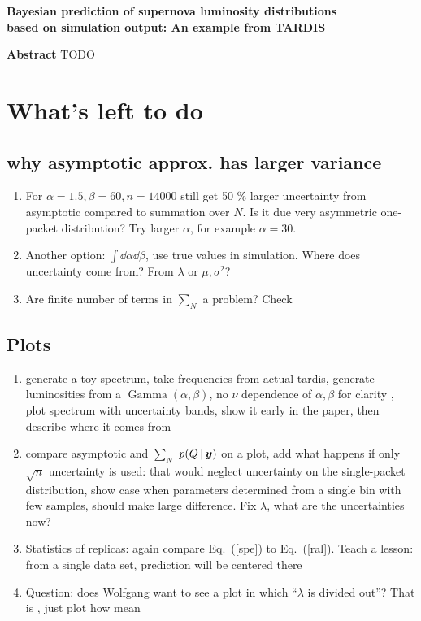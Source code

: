\documentclass[11pt]{article}
\newcommand{\cond}{\,|\,}
\newcommand{\refeq}[1]{Eq.~(\ref{#1})}
\DeclareMathOperator{\GammaDist}{Gamma}
\newcommand{\Lumtot}{Q}
\newcommand{\rmdx}[1]{\dd{#1}} %
\newcommand{\tardis}{TARDIS}
\begin{document}
\begin{center}
  \textbf{\Large Bayesian prediction of supernova luminosity  distributions}\\[8pt]
  \textbf{\Large based on simulation output: An example from \tardis}\\[12pt]
\end{center}

\textbf{Abstract} TODO\\

\section{What's left to do}

\subsection{why asymptotic approx. has larger variance}
\begin{enumerate}
  \item For $\alpha=1.5, \beta=60, n=14000$ still get 50 \% larger uncertainty from asymptotic compared to summation over $N$. Is it due very asymmetric one-packet distribution? Try larger $\alpha$, for example $\alpha = 30$.
  \item  Another option: $\int \rmdx{\alpha} \rmdx{\beta}$, use true values in simulation. Where does uncertainty come from? From $\lambda$ or $\mu, \sigma^2$?
  \item Are finite number of terms in $\sum_N$ a problem? Check
\end{enumerate}

\subsection{Plots}

\begin{enumerate}
  \item generate a toy spectrum, take frequencies from actual tardis,
  generate luminosities from a $\GammaDist(\alpha, \beta)$, no $\nu$
  dependence of $\alpha, \beta$ for clarity , plot spectrum with
  uncertainty bands, show it early in the paper, then describe where
  it comes from
  \item compare asymptotic and $\sum_N$ $p(\Lumtot \cond \bmy)$ on a
  plot, add what happens if only $\sqrt{n}$ uncertainty is used: that
  would neglect uncertainty on the single-packet distribution, show
  case when parameters determined from a single bin with few samples,
  should make large difference. Fix $\lambda$, what are the uncertainties now?
  \item Statistics of replicas: again compare \refeq{spe} to \refeq{ral}. Teach a lesson: from a single data set, prediction will be centered there
  \item Question: does Wolfgang want to see a plot in which ``$\lambda$ is divided out''? That is , just plot how mean
\end{enumerate}
\end{document}

